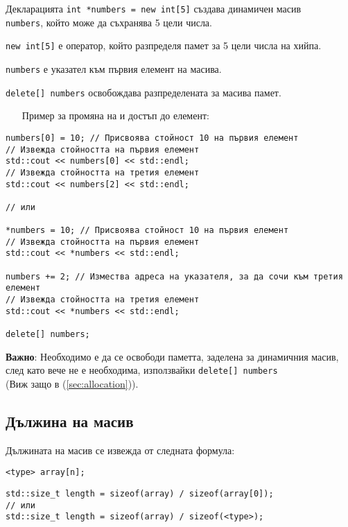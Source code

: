 \documentclass[oneside]{book}
\newcommand*{\code}[1]{\texttt{#1}}
\begin{document}
Декларацията \code{int *numbers = new int[5]} създава динамичен масив\\\code{numbers}, който може да съхранява 5 цели числа.

\code{new int[5]} е оператор, който разпределя памет за 5 цели числа на хийпа.

\code{numbers} е указател към първия елемент на масива.

\code{delete[] numbers} освобождава разпределената за масива памет.

\begin{itemize}\item[Пример] за промяна на и достъп до елемент:\end{itemize}
\begin{mdframed}\begin{lstlisting} 
numbers[0] = 10; // Присвоява стойност 10 на първия елемент
// Извежда стойността на първия елемент
std::cout << numbers[0] << std::endl;
// Извежда стойността на третия елемент
std::cout << numbers[2] << std::endl;

// или

*numbers = 10; // Присвоява стойност 10 на първия елемент
// Извежда стойността на първия елемент
std::cout << *numbers << std::endl;

numbers += 2; // Измества адреса на указателя, за да сочи към третия елемент
// Извежда стойността на третия елемент
std::cout << *numbers << std::endl;

delete[] numbers;
\end{lstlisting}\end{mdframed}

\textbf{Важно}: Необходимо е да се освободи паметта, заделена за динамичния масив, след като вече не е необходима, използвайки \code{delete[] numbers}\\(Виж защо в (\ref{sec:allocation})).

\subsection{Дължина на масив}
Дължината на масив се извежда от следната формула:

\begin{mdframed}\begin{lstlisting}
<type> array[n];
\end{lstlisting}\end{mdframed}
\begin{mdframed}\begin{lstlisting}[firstnumber=2]
std::size_t length = sizeof(array) / sizeof(array[0]);
// или
std::size_t length = sizeof(array) / sizeof(<type>);
\end{lstlisting}\end{mdframed}
\end{document}
